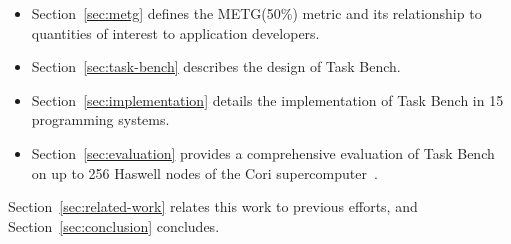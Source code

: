 \begin{itemize}
\item Section~\ref{sec:metg} defines the METG(50\%) metric and its
  relationship to quantities of interest to application developers.
\item Section~\ref{sec:task-bench} describes the design of Task Bench.
\item Section~\ref{sec:implementation} details the implementation of
  Task Bench in 15 programming systems.
\item Section~\ref{sec:evaluation} provides a comprehensive evaluation
  of Task Bench on up to 256 Haswell nodes of the Cori
  supercomputer~\cite{Cori}.
\end{itemize}

Section~\ref{sec:related-work} relates this work to previous efforts,
and Section~\ref{sec:conclusion} concludes.
